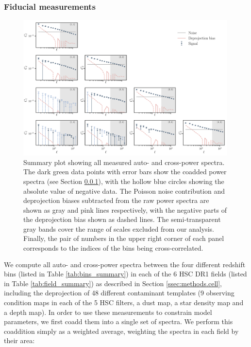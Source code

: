 \documentclass[a4paper,11pt]{article}
\begin{document}
    \subsubsection{Fiducial measurements}\label{sssec:results.spectra.fid}
      \begin{figure}
        \centering
        \includegraphics[width=0.99\textwidth]{figures/cls_summary.pdf}
        \caption{Summary plot showing all measured auto- and cross-power spectra. The dark green data points with error bars show the coadded power spectra (see Section \ref{sssec:results.spectra.fid}), with the hollow blue circles showing the absolute value of negative data. The Poisson noise contribution and deprojection biases subtracted from the raw power spectra are shown as gray and pink lines respectively, with the negative parts of the deprojection bias shown as dashed lines. The semi-transparent gray bands cover the range of scales excluded from our analysis. Finally, the pair of numbers in the upper right corner of each panel corresponds to the indices of the bins being cross-correlated.}
        \label{fig:cls_summary}
      \end{figure}
      We compute all auto- and cross-power spectra between the four different redshift bins (listed in Table \ref{tab:bins_summary}) in each of the 6 HSC DR1 fields (listed in Table \ref{tab:field_summary}) as described in Section \ref{ssec:methods.cell}, including the deprojection of 48 different contaminant templates (9 observing condition maps in each of the 5 HSC filters, a dust map, a star density map and a depth map). In order to use these measurements to constrain model parameters, we first coadd them into a single set of spectra. We perform this coaddition simply as a weighted average, weighting the spectra in each field by their area:
\end{document}
